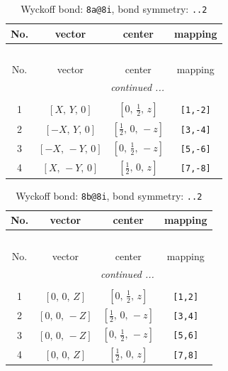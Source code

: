 \documentclass[fleqn,8pt]{jsarticle}
\begin{document}
\begin{longtable}{cccc}
\caption{Wyckoff bond: {\tt 8a@8i}, bond symmetry: {\tt ..2}}
 \\
 \hline \hline
No. & vector & center & mapping \\ \hline \endfirsthead

\multicolumn{3}{l}{\tablename\ \thetable{}} \\
 \hline \hline
No. & vector & center & mapping \\ \hline \endhead

 \hline \hline
\multicolumn{3}{r}{\footnotesize\it continued ...} \\ \endfoot

 \hline \hline
\multicolumn{3}{r}{} \\ \endlastfoot

1 & $\left[ X,\, Y,\, 0 \right]$ & $\left[ 0,\, \frac{1}{2},\, z \right]$ & {\tt [1,-2]} \\ \hline
2 & $\left[ - X,\, Y,\, 0 \right]$ & $\left[ \frac{1}{2},\, 0,\, - z \right]$ & {\tt [3,-4]} \\ \hline
3 & $\left[ - X,\, - Y,\, 0 \right]$ & $\left[ 0,\, \frac{1}{2},\, - z \right]$ & {\tt [5,-6]} \\ \hline
4 & $\left[ X,\, - Y,\, 0 \right]$ & $\left[ \frac{1}{2},\, 0,\, z \right]$ & {\tt [7,-8]} \\
\end{longtable}
\renewcommand{\arraystretch}{1.2}
\begin{longtable}{cccc}
\caption{Wyckoff bond: {\tt 8b@8i}, bond symmetry: {\tt ..2}}
 \\
 \hline \hline
No. & vector & center & mapping \\ \hline \endfirsthead

\multicolumn{3}{l}{\tablename\ \thetable{}} \\
 \hline \hline
No. & vector & center & mapping \\ \hline \endhead

 \hline \hline
\multicolumn{3}{r}{\footnotesize\it continued ...} \\ \endfoot

 \hline \hline
\multicolumn{3}{r}{} \\ \endlastfoot

1 & $\left[ 0,\, 0,\, Z \right]$ & $\left[ 0,\, \frac{1}{2},\, z \right]$ & {\tt [1,2]} \\ \hline
2 & $\left[ 0,\, 0,\, - Z \right]$ & $\left[ \frac{1}{2},\, 0,\, - z \right]$ & {\tt [3,4]} \\ \hline
3 & $\left[ 0,\, 0,\, - Z \right]$ & $\left[ 0,\, \frac{1}{2},\, - z \right]$ & {\tt [5,6]} \\ \hline
4 & $\left[ 0,\, 0,\, Z \right]$ & $\left[ \frac{1}{2},\, 0,\, z \right]$ & {\tt [7,8]} \\
\end{longtable}
\end{document}
